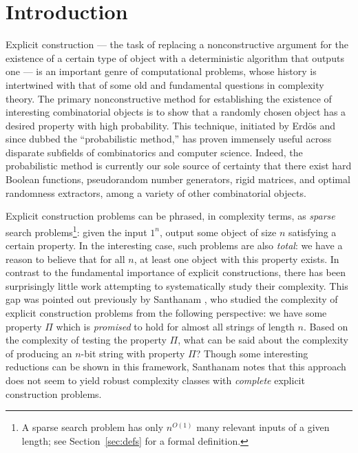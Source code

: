 %

\section{Introduction}\label{sec:intro}
Explicit construction --- the task of replacing a nonconstructive argument for the existence of a certain type of object with a deterministic algorithm that outputs one --- is an important genre of computational problems, whose history is intertwined with that of some old and fundamental questions in complexity theory. The primary nonconstructive method for establishing the existence of interesting combinatorial objects is to show that a randomly chosen object has a desired property with high probability. This technique, initiated by Erd{\"o}s \cite{Erdos} and since dubbed the ``probabilistic method,'' has proven immensely useful across disparate subfields of combinatorics and computer science. Indeed, the probabilistic method is currently our sole source of certainty that there exist hard Boolean functions, pseudorandom number generators, rigid matrices, and optimal randomness extractors,
among a variety of other combinatorial objects.

Explicit construction problems can be phrased, in complexity terms, as \emph{sparse} search problems\footnote{A sparse search problem has only $n^{O(1)}$ many relevant inputs of a given length; see Section~\ref{sec:defs} for a formal definition.}: given the input $1^n$, output some object of size $n$ satisfying a certain property. In the interesting case, such problems are also \emph{total}: we have a reason to believe that for all $n$, at least one object with this property exists. In contrast to the fundamental importance of explicit constructions, there has been surprisingly little work attempting to systematically study their complexity. This gap was pointed out previously by Santhanam \cite{explicit-constructions}, who studied the complexity of explicit construction problems from the following perspective: we have some property $\Pi$ which is \emph{promised} to hold for almost all strings of length $n$. Based on the complexity of testing the property $\Pi$, what can be said about the complexity of producing an $n$-bit string with property $\Pi$? Though some interesting reductions can be shown in this framework, Santhanam notes that this approach does not seem to yield robust complexity classes with \emph{complete} explicit construction problems.

